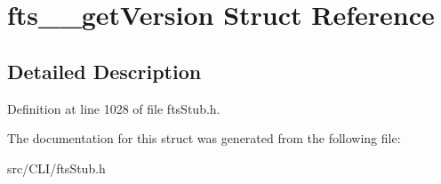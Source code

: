 \section{fts\_\-\_\-getVersion Struct Reference}
\label{structfts____getVersion}


\subsection{Detailed Description}


Definition at line 1028 of file ftsStub.h.



The documentation for this struct was generated from the following file:\begin{DoxyCompactItemize}
\item 
src/CLI/ftsStub.h\end{DoxyCompactItemize}
